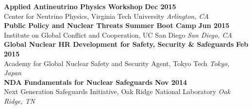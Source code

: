 {\bf Applied Antineutrino Physics Workshop} \hfill {\bf Dec 2015}\\
{\small{Center for Neutrino Physics, Virginia Tech University}} \hfill {\sl Arlington, CA}\\[-3.5ex]

{\bf Public Policy and Nuclear Threats Summer Boot Camp} \hfill {\bf Jun 2015}\\
{\small{Institute on Global Conflict and Cooperation, UC San Diego}} \hfill {\sl San Diego, CA}\\[-3.5ex]

{\bf Global Nuclear HR Development for Safety, Security \& Safeguards} \hfill {\bf Feb 2015}\\
{\small{Academy for Global Nuclear Safety and Security Agent, Tokyo Tech}}  \hfill {\sl Tokyo, Japan}\\[-3.5ex]

{\bf NDA Fundamentals for Nuclear Safeguards}   \hfill {\bf Nov 2014}\\
{\small{Next Generation Safeguards Initiative, Oak Ridge National Laboratory}} \hfill  {\sl Oak Ridge, TN}

%

